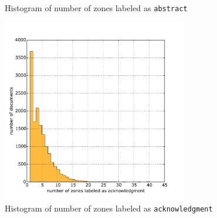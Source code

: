 \begin{appendix}
\begin{figure}[b!]
\begin{minipage}[t!]{0.48\linewidth}
  \caption{Histogram of number of zones labeled as \texttt{abstract}}
  \label{fig:abstract_histogram}
\end{minipage}
\quad
\begin{minipage}[t!]{0.48\linewidth}
  \includegraphics[width=8cm]{plots/acknowledgment_histogram}
  \caption{Histogram of number of zones labeled as \texttt{acknowledgment}}
  \label{fig:acknowledgment_histogram}
\end{minipage}
\end{figure}


\end{appendix}
